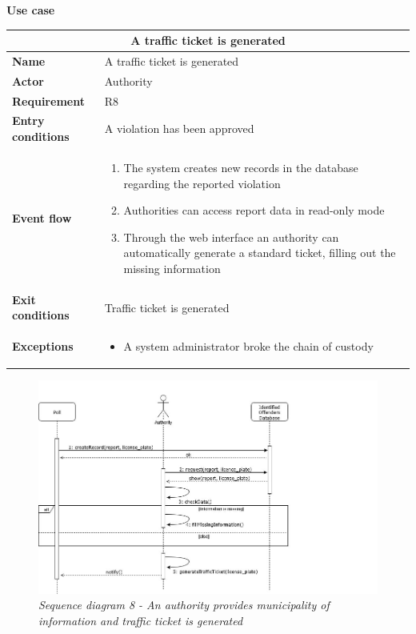 \begin{description}
    \item \textbf{Use case}
    \begin{center}
        \begin{tabular}{|p{3cm}|p{7cm}|}
            \multicolumn{2}{c}{\textbf{A traffic ticket is generated}} \\
            \hline
            \textbf{Name} & A traffic ticket is generated \\
            \hline
            \textbf{Actor} & Authority \\
            \hline
            \textbf{Requirement} & R8 \\
            \hline
            \textbf{Entry conditions} & A violation has been approved \\
            \hline
            \textbf{Event flow} &
            \begin{enumerate}
                \item The system creates new records in the database regarding the reported violation
                \item Authorities can access report data in read-only mode
                \item Through the web interface an authority can automatically generate a standard ticket, filling out the missing information
            \end{enumerate} \\
            \hline
            \textbf{Exit conditions} & Traffic ticket is generated \\
            \hline
            \textbf{Exceptions}
            & \begin{itemize}
                \item A system administrator broke the chain of custody
            \end{itemize} \\
            \hline
        \end{tabular}
    \end{center}
\end{description}

\begin{figure}[H]
    \centering
    \includegraphics[width=\textwidth]{RASD_Images/SequenceDiagrams/8.jpg}
    \caption{\textit{Sequence diagram 8 - An authority provides municipality of information and traffic ticket is generated}}
\end{figure}

